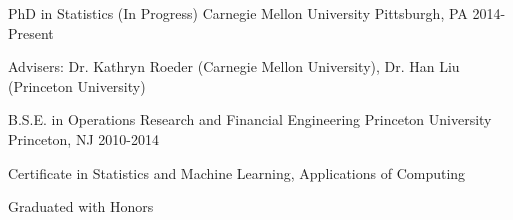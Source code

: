 

\begin{cventries}

  \cventry
      {PhD in Statistics (In Progress)} %
      {Carnegie Mellon University} %
      {Pittsburgh, PA} %
      {2014-Present} %
      {
        \begin{cvitems} %
          \item {Advisers: Dr. Kathryn Roeder (Carnegie Mellon University), Dr. Han Liu (Princeton University)}
        \end{cvitems}
      }
  
  \cventry
    {B.S.E. in Operations Research and Financial Engineering} %
    {Princeton University} %
    {Princeton, NJ} %
    {2010-2014} %
    {
      \begin{cvitems} %
        \item {Certificate in Statistics and Machine Learning, Applications of Computing}
        \item {Graduated with Honors}
      \end{cvitems}
    }

\end{cventries}
